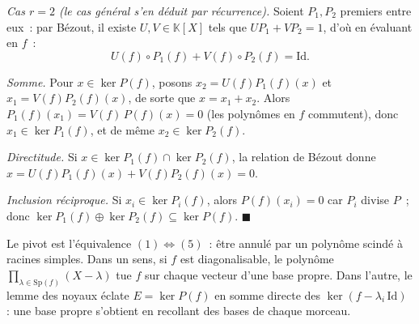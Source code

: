 \begin{mdframed}[style=proofbar]
  \textit{Cas $r = 2$ (le cas général s'en déduit par récurrence).}
  Soient $P_1, P_2$ premiers entre eux~: par Bézout, il existe
  $U, V \in \mathbb{K}[X]$ tels que $U P_1 + V P_2 = 1$, d'où en évaluant
  en $f$~:
  \[
    U(f)\circ P_1(f) + V(f)\circ P_2(f) = \mathrm{Id}.
  \]

  \textit{Somme.} Pour $x \in \ker P(f)$, posons
  $x_2 = U(f)P_1(f)(x)$ et $x_1 = V(f)P_2(f)(x)$, de sorte que
  $x = x_1 + x_2$. Alors $P_1(f)(x_1) = V(f)\,P(f)(x) = 0$ (les polynômes
  en $f$ commutent), donc $x_1 \in \ker P_1(f)$, et de même
  $x_2 \in \ker P_2(f)$.

  \textit{Directitude.} Si $x \in \ker P_1(f) \cap \ker P_2(f)$, la relation
  de Bézout donne $x = U(f)P_1(f)(x) + V(f)P_2(f)(x) = 0$.

  \textit{Inclusion réciproque.} Si $x_i \in \ker P_i(f)$, alors
  $P(f)(x_i) = 0$ car $P_i$ divise $P$~; donc
  $\ker P_1(f) \oplus \ker P_2(f) \subseteq \ker P(f)$.
  \hfill$\blacksquare$
\end{mdframed}

\decsep{}


\begin{ideepreuve}
Le pivot est l'équivalence $(1) \Leftrightarrow (5)$~: être annulé par un
polynôme scindé à racines simples. Dans un sens, si $f$ est diagonalisable,
le polynôme $\prod_{\lambda \in \mathrm{Sp}(f)}(X - \lambda)$ tue $f$ sur
chaque vecteur d'une base propre. Dans l'autre, le lemme des noyaux éclate
$E = \ker P(f)$ en somme directe des $\ker(f - \lambda_i\,\mathrm{Id})$ :
une base propre s'obtient en recollant des bases de chaque morceau.
\end{ideepreuve}



